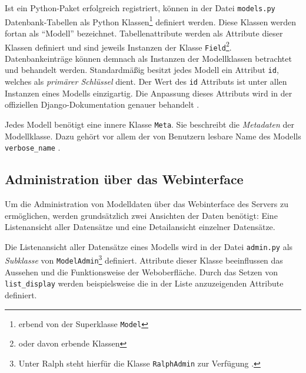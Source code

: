 Ist ein Python-Paket erfolgreich registriert, können in der Datei
\texttt{models.py} Datenbank-Tabellen als Python Klassen\footnote{erbend
  von der Superklasse \texttt{Model}\cite{django-doku-models}} definiert
werden. Diese Klassen werden fortan als ``Modell'' bezeichnet.
Tabellenattribute werden als Attribute dieser Klassen definiert und sind
jeweils Instanzen der Klasse
\texttt{Field}\cite{django-doku-models}\footnote{oder davon erbende
  Klassen}. Datenbankeinträge können demnach als Instanzen der
Modellklassen betrachtet und behandelt werden. Standardmäßig besitzt
jedes Modell ein Attribut \texttt{id}, welches als
\emph{primärer Schlüssel}
dient. Der Wert des \texttt{id} Attributs ist unter allen Instanzen
eines Modells einzigartig. Die Anpassung dieses Attributs wird in der
offiziellen Django-Dokumentation genauer behandelt
\cite{django-doku-models}.

Jedes Modell benötigt eine innere Klasse \texttt{Meta}. Sie beschreibt
die
\emph{Metadaten}
der Modellklasse. Dazu gehört vor allem der von Benutzern lesbare Name
des Modells \texttt{verbose\_name} \cite{django-doku-models-options}.

\hypertarget{administration-uxfcber-das-webinterface}{%
\subsection{Administration über das
Webinterface}\label{administration-uxfcber-das-webinterface}}

Um die Administration von Modelldaten über das Webinterface des Servers
zu ermöglichen, werden grundsätzlich zwei Ansichten der Daten benötigt:
Eine Listenansicht aller Datensätze und eine Detailansicht einzelner
Datensätze.

Die Listenansicht aller Datensätze eines Modells wird in der Datei
\texttt{admin.py} als
\emph{Subklasse}
von \texttt{ModelAdmin}\footnote{Unter Ralph steht hierfür die Klasse
  \texttt{RalphAdmin} zur Verfügung \cite{ralph-admin-doku}.} definiert.
Attribute dieser Klasse beeinflussen das Aussehen und die Funktionsweise
der Weboberfläche. Durch das Setzen von \texttt{list\_display} werden
beispielsweise die in der Liste anzuzeigenden Attribute definiert.

